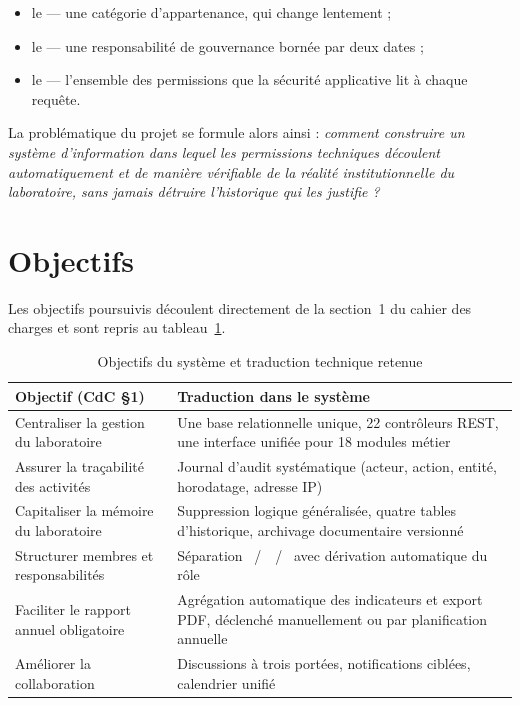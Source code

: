 \begin{itemize}
  \item le \srt{} --- une catégorie d'appartenance, qui change lentement ;
  \item le \man{} --- une responsabilité de gouvernance bornée par deux dates ;
  \item le \rol{} --- l'ensemble des permissions que la sécurité applicative lit à chaque
        requête.
\end{itemize}

La problématique du projet se formule alors ainsi : \emph{comment construire un système
d'information dans lequel les permissions techniques découlent automatiquement et de
manière vérifiable de la réalité institutionnelle du laboratoire, sans jamais détruire
l'historique qui les justifie ?}

\section{Objectifs}

Les objectifs poursuivis découlent directement de la section~1 du cahier des charges et
sont repris au tableau~\ref{tab:objectifs}.

\begin{table}[H]
\centering
\caption{Objectifs du système et traduction technique retenue}
\label{tab:objectifs}
\small
\begin{tabularx}{\textwidth}{@{}p{5.1cm}X@{}}
\toprule
\textbf{Objectif (CdC §1)} & \textbf{Traduction dans le système} \\
\midrule
Centraliser la gestion du laboratoire & Une base relationnelle unique, 22 contrôleurs REST, une interface unifiée pour 18 modules métier \\
Assurer la traçabilité des activités & Journal d'audit systématique (acteur, action, entité, horodatage, adresse IP) \\
Capitaliser la mémoire du laboratoire & Suppression logique généralisée, quatre tables d'historique, archivage documentaire versionné \\
Structurer membres et responsabilités & Séparation \srt{}~/~\rol{}~/~\man{} avec dérivation automatique du rôle \\
Faciliter le rapport annuel obligatoire & Agrégation automatique des indicateurs et export PDF, déclenché manuellement ou par planification annuelle \\
Améliorer la collaboration & Discussions à trois portées, notifications ciblées, calendrier unifié \\
\bottomrule
\end{tabularx}
\end{table}

